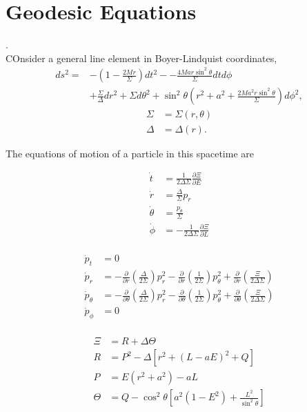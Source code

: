 
\chapter{Geodesic Equations}.\\
COnsider a general line element in Boyer-Lindquist coordinates,
\begin{align*}
	ds^2 = &-\left( 1- \frac{2Mr}{\Sigma} \right) dt^2 - -\frac{4Mar\sin^2 \theta}{\Sigma} dt d\phi\\
	&+ \frac{\Sigma}{\Delta} dr^2 +\Sigma d\theta^2 + \sin^2 \theta \left( r^2 + a^2 +\frac{2Ma^2 r \sin^2 \theta}{\Sigma} \right) d\phi^2,
\end{align*}
\begin{align*}
	\Sigma &= \Sigma(r,\theta)\\
	\Delta &= \Delta(r).
\end{align*}

The equations of motion of a particle in this spacetime are 

\begin{align*}
	\dot{t} &= \frac{1}{2\Delta \Sigma} \frac{\partial \Xi}{\partial E}\\
	\dot{r} &= \frac{\Delta}{\Sigma} p_r \\
	\dot{\theta} &= \frac{p_\theta}{\Sigma}\\
	\dot{\phi} &= - \frac{1}{2\Delta \Sigma} \frac{\partial \Xi}{\partial L}\\	
\end{align*}

\begin{align*}
\dot{p}_t &= 0\\
\dot{p}_r &= -\frac{\partial}{\partial r}\left( \frac{\Delta}{2\Sigma}\right) p_r^2 - \frac{\partial}{\partial r}\left( \frac{1}{2\Sigma}\right) p_\theta^2 + \frac{\partial}{\partial r}\left( \frac{\Xi}{2\Delta \Sigma}\right) \\
\dot{p}_\theta &= -\frac{\partial}{\partial \theta}\left( \frac{\Delta}{2\Sigma}\right) p_r^2 - \frac{\partial}{\partial \theta}\left( \frac{1}{2\Sigma}\right) p_\theta^2 + \frac{\partial}{\partial \theta}\left( \frac{\Xi}{2\Delta \Sigma}\right)\\
\dot{p}_\phi &= 0\\	
\end{align*}

\begin{align*}
	\Xi &= R + \Delta \Theta \\
	R &= P^2 - \Delta \left[ r^2 + (L-aE)^2 + Q \right] \\
	P &= E(r^2 + a^2) - aL\\
	\Theta &= Q - \cos^2 \theta \left[ a^2 (1-E^2) + \frac{L^2}{\sin^2 \theta} \right]
\end{align*}






